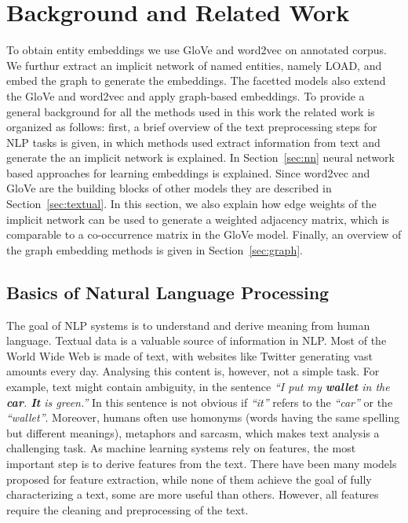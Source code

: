 
\chapter{Background and Related Work}\label{chap:background}
To obtain entity embeddings we use GloVe and word2vec on annotated corpus. We furthur extract an implicit network of named entities, namely LOAD, and embed the graph to generate the embeddings. The facetted models also extend the GloVe and word2vec and apply graph-based embeddings. To provide a general background for all the methods used in this work the related work is organized as follows: first, a brief overview of the text preprocessing steps for NLP tasks is given, in which methods used extract information from text and generate the an implicit network is explained. In Section~\ref{sec:nn}  neural network based approaches for learning embeddings is explained. Since word2vec and GloVe are the building blocks of other models they are described in Section~\ref{sec:textual}. In this section, we also explain how edge weights of the implicit network can be used to generate a weighted adjacency matrix, which is comparable to a co-occurrence matrix in the GloVe model.  Finally, an overview of the graph embedding methods is given in Section~\ref{sec:graph}.
\section{Basics of Natural Language Processing}
The goal of NLP systems is to understand and derive meaning from human language. Textual data is a valuable source of information in NLP. Most of the World Wide Web is made of text, with websites like Twitter generating vast amounts every day. Analysing this content is, however, not a simple task. For example, text might contain ambiguity, in the sentence \emph{``I put my \textbf{wallet} in the  \textbf{car}.  \textbf{It} is green.''} In this sentence is not obvious if \emph{``it''} refers to the \emph{``car''} or the  \emph{``wallet''}. Moreover, humans often use homonyms (words having the same spelling but different meanings), metaphors and sarcasm, which makes text analysis a challenging task. 
\noindent
As machine learning systems rely on features, the most important step is to derive features from the text. There have been many models proposed for feature extraction, while none of them achieve the goal of fully characterizing a text, some are more useful than others. However, all features require the cleaning and preprocessing of the text. 

